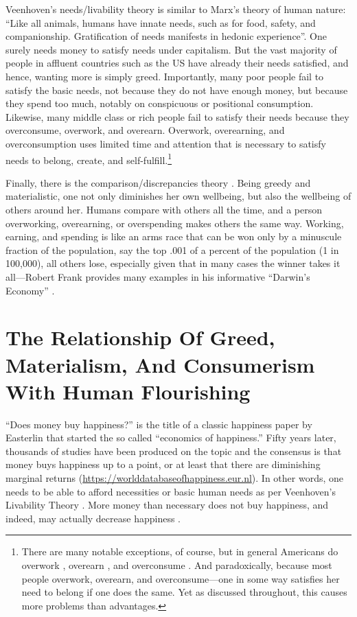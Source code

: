 \documentclass[10pt, letterpaper]{article}
\begin{document}
\begin{spacing}{1.8}
Veenhoven's needs/livability theory is similar to Marx's theory of human nature:
``Like all animals, humans have innate needs, such as for food, safety, and
companionship. Gratification of needs manifests in hedonic
experience''\citep[][p. 3645]{veenhoven14b}.
 One surely needs money to satisfy needs under capitalism. But the vast majority
of people in affluent countries such as the US have already their needs
satisfied, and hence, wanting more is simply greed. Importantly, many poor people fail
to satisfy the basic needs, not because they do not have enough money, but because they spend too much, notably on conspicuous or positional consumption. 
%
Likewise, many middle class or rich people fail to satisfy their needs because
they overconsume, overwork, and overearn. Overwork,
overearning, and overconsumption uses limited time and attention that is
necessary to satisfy needs to belong, create, and self-fulfill.\footnote{There
  are many notable exceptions, of course, but in general Americans do overwork \citep{aokditella},
  overearn \citep{hsee13}, and overconsume \citep{kasser13}. And paradoxically,
  because most people overwork, overearn, and overconsume---one in some way
  satisfies her need to belong if one does the same. Yet as discussed throughout, 
  this causes more problems than advantages.}  

Finally, there is the comparison/discrepancies theory \citep{michalos85}. Being
greedy and  materialistic, one not only diminishes her own wellbeing, but also the
wellbeing of others around her. Humans compare with others all the time, and
a person overworking, overearning, or overspending makes others the same
way. Working, earning, and spending is like an arms race that can be won only by
a minuscule fraction of the population, say the top .001 of a percent of the
population (1 in 100,000), all others lose, especially given that in many cases the winner takes it all---Robert Frank provides many examples in his informative ``Darwin's Economy'' \citeyear{frank12}. 

\section{\label{rel}The Relationship Of Greed, Materialism, And Consumerism With  Human Flourishing}


``Does money buy happiness?'' is the title of a classic happiness paper by Easterlin \citeyear{easterlin73} that started the so called ``economics of happiness.'' Fifty
years later, thousands of studies have been produced on the topic and the consensus is that money buys happiness up to a point, or at least that there are diminishing marginal returns (\url{https://worlddatabaseofhappiness.eur.nl}).
%
%
% 
 In other words, one needs to be able to afford necessities or basic human needs as per Veenhoven's Livability Theory \citep{veenhoven14b}. More
 money than necessary does not buy happiness, and indeed, may actually decrease happiness %
 .


\end{spacing}
\end{document}
